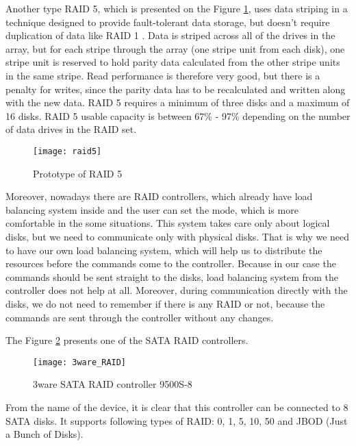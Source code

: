 Another type RAID 5, which is presented on the Figure \ref{fig:raid5}, uses data striping in a technique designed to provide fault-tolerant data storage, but doesn't require duplication of data like RAID 1 \cite{raid_overview}. Data is striped across all of the drives in the array, but for each stripe through the array (one stripe unit from each disk), one stripe unit is reserved to hold parity data calculated from the other stripe units in the same stripe. Read performance is therefore very good, but there is a penalty for writes, since the parity data has to be recalculated and written along with the new data. RAID 5 requires a minimum of three disks and a maximum of 16 disks. RAID 5 usable capacity is between 67\% - 97\% depending on the number of data drives in the RAID set.
\begin{figure}[h]
\begin{center}
  \texttt{[image: raid5]}
\end{center}
  \caption{Prototype of RAID 5}
  \label{fig:raid5}
\end{figure}
Moreover, nowadays there are RAID controllers, which already have load balancing system inside and the user can set the mode, which is more comfortable in the some situations. This system takes care only about logical disks, but we need to communicate only with physical disks. That is why we need to have our own load balancing system, which will help us to distribute the resources before the commands come to the controller. Because in our case the commands should be sent straight to the disks, load balancing system from the controller does not help at all. Moreover, during communication directly with the disks, we do not need to remember if there is any RAID or not, because the commands are sent through the controller without any changes.  

The Figure \ref{fig:3ware_RAID} presents one of the SATA RAID controllers. 
\begin{figure}[h]
\begin{center}
  \texttt{[image: 3ware\_RAID]}
\end{center}
  \caption{3ware SATA RAID controller 9500S-8}
  \label{fig:3ware_RAID}
\end{figure}
From the name of the device, it is clear that this controller can be connected to 8 SATA disks. It supports following types of RAID: 0, 1, 5, 10, 50 and JBOD (Just a Bunch of Disks).

\newpage
